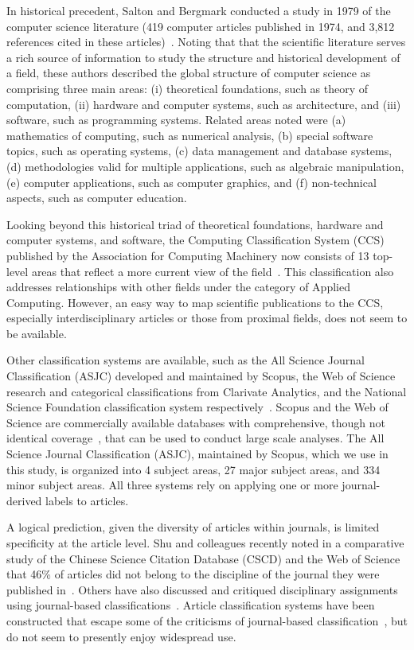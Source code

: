 In historical precedent, Salton and Bergmark conducted a study  in 1979 of the computer science literature (419 computer articles published in 1974,  and 3,812 references cited in these articles)~\cite{salton_citation_1979}. Noting that that the scientific literature serves a rich source of information to study the structure and historical development of a field, these authors described the global structure of computer science as comprising three main areas: (i) theoretical foundations, such as theory of computation, (ii) hardware and computer systems, such as architecture,  and (iii) software, such as programming systems.  Related areas noted were (a) mathematics of computing, such as numerical analysis, (b) special software topics, such as operating systems, (c) data management and database systems, (d) methodologies valid for multiple applications, such as algebraic manipulation, (e) computer applications, such as computer graphics, and  (f) non-technical aspects, such as computer education. 

Looking beyond this historical triad of theoretical foundations, hardware and computer systems, and software, the Computing Classification System (CCS) published by the Association for Computing Machinery now consists of 13 top-level areas that reflect a more current view of the field~\cite{acm_ref}. This classification also addresses relationships with other fields under the category of Applied Computing. However, an easy way to map scientific publications to the CCS, especially interdisciplinary articles or those from proximal fields, does not seem to be available. 

Other classification systems are available, such as the All Science Journal Classification (ASJC) developed and maintained by Scopus, the Web of Science research and categorical classifications from Clarivate Analytics, and the National Science Foundation classification system respectively~\cite{nsf_classification,scopus_ref,wos_ref}. Scopus and the Web of Science are commercially available databases with comprehensive, though not identical coverage~\cite{archambault_2009}, that can be used to conduct large scale analyses. The All Science Journal Classification (ASJC), maintained by Scopus, which we use in this study, is organized  into 4 subject areas, 27 major subject areas, and 334 minor subject areas. All three systems rely on applying one or more journal-derived labels to articles.  

A logical prediction, given the diversity of articles within journals, is limited specificity at the article level. Shu and colleagues recently noted in a comparative study of the Chinese Science Citation Database (CSCD)  and the Web of Science that 46\% of articles did not belong to the discipline of the journal they were published in~\cite{shu_comparing_2019}. Others have also discussed and critiqued disciplinary assignments using journal-based classifications~\cite{wang_large-scale_2016,perianes-rodriguez_comparison_2017}. Article classification systems have been constructed that escape some of the criticisms of journal-based classification~\cite{traag_louvain_2019,boyack_classification_2014,waltman_new_2012}, but do not seem to presently enjoy widespread use. 

